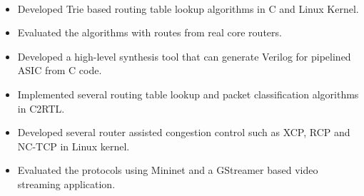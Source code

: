 \\







\begin{itemize}
\item Developed Trie based routing table lookup algorithms in C and Linux Kernel. 
\item Evaluated the algorithms with routes from real core routers.
\end{itemize}
\smallskip
{}
\begin{itemize}
\item Developed a high-level synthesis tool that can generate Verilog for pipelined ASIC from C code.
\item Implemented several routing table lookup and packet classification algorithms in C2RTL.
\end{itemize}
\smallskip
{}
\begin{itemize}
\item Developed several router assisted congestion control such as XCP, RCP and NC-TCP in Linux kernel.
\item Evaluated the protocols using Mininet and a GStreamer based video streaming application. 
\end{itemize}

